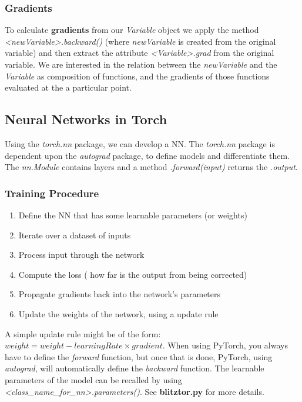 \documentclass[]{report}
\newcommand{\tif}{\textit}
\newcommand{\tbf}{\textbf}
\begin{document}
\subsubsection{Gradients}

To calculate \textbf{gradients} from our \textit{Variable} object we apply the method \textit{<newVariable>.backward()} (where \textit{newVariable} is created from the original variable) and then extract the attribute \textit{<Variable>.grad} from the original variable. We are interested in the relation between the \textit{newVariable} and the \textit{Variable} as composition of functions, and the gradients of those functions evaluated at the a particular point. 


\subsection{Neural Networks in Torch}

Using the \textit{torch.nn} package, we can develop a NN. The \textit{torch.nn} package is dependent upon the \textit{autograd} package, to define models and differentiate them.  The \tif{nn.Module} contains layers and a method \tif{.forward(input)} returns the \tif{.output}. 

\subsubsection{Training Procedure}
\begin{enumerate}
	\item Define the NN that has some learnable parameters (or weights) 
	\item Iterate over a dataset of inputs
	\item Process input through the network
	\item Compute the loss ( how far is the output from being corrected)
	\item Propagate gradients back into the network's parameters
	\item Update the weights of the network, using a update rule
\end{enumerate} 

A simple update rule might be of the form: $weight = weight - learningRate \times gradient$. When using PyTorch, you always have to define the \tif{forward} function, but once that is done, PyTorch, using \tif{autograd}, will automatically define the \tif{backward} function.  The learnable parameters of the model can be recalled by using \textit{<class\_name\_for\_nn>.parameters()}. See \tbf{blitztor.py} for more details.\\
\end{document}
